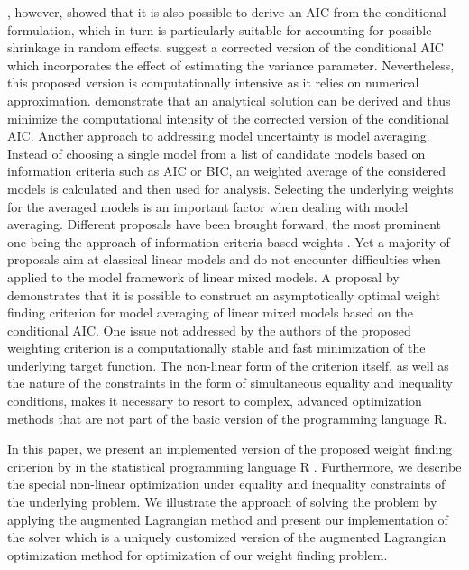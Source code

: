 \cite{Vaida.2005}, however, showed that it is also possible to derive an AIC from the conditional formulation, which in turn is particularly 
suitable for accounting for possible shrinkage in random effects. \cite{liang2008note} suggest a corrected version of the conditional AIC which incorporates the effect of estimating the variance parameter. Nevertheless, this proposed version is computationally intensive as it relies on numerical approximation. \cite{Greven.2010} demonstrate that an analytical solution can be derived and thus minimize the computational intensity of the corrected version of the conditional AIC.
Another approach to addressing model uncertainty is model averaging.  Instead of choosing a single model from a list of candidate models based on information criteria such as AIC or BIC,  an weighted average of the considered models is calculated and then used for analysis. Selecting the underlying weights for the averaged models is an important factor when dealing with model averaging. Different proposals have been brought forward, the most prominent one being the approach of information criteria based weights \citep{Buckland.1997}. Yet a majority of proposals aim at classical linear models and do not encounter difficulties when applied to the model framework of linear mixed models. 
A proposal by \cite{Zhang.2014} demonstrates that it is possible to construct an asymptotically optimal weight finding criterion for model averaging of linear mixed models based on the conditional AIC. 
One issue not addressed by the authors of the proposed weighting criterion is a computationally stable and fast minimization of the underlying target function. The non-linear form of the criterion itself, as well as the nature of the constraints in the form of simultaneous equality and inequality conditions, makes it necessary to resort to complex, advanced optimization methods that are not part of the basic version of the programming language R.

In this paper, we present an implemented version of the proposed weight finding criterion by \cite{Zhang.2014} in the statistical programming language R \citep{r.team}.
Furthermore, we describe the special non-linear optimization under equality and inequality constraints of the underlying problem.  We illustrate the approach of solving the problem by applying the augmented Lagrangian method \citep{hestenes1969multiplier, powell1969method} and present our implementation of the solver which is a uniquely customized version of the augmented Lagrangian optimization method for optimization of our weight finding problem.

